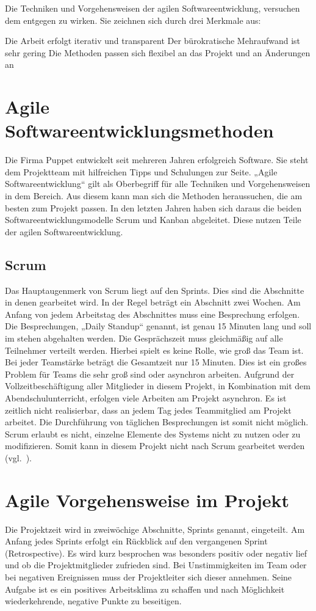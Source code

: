 Die Techniken und Vorgehensweisen der agilen Softwareentwicklung, versuchen dem
entgegen zu wirken. Sie zeichnen sich durch drei Merkmale aus:

\begin{outline}
  \1 Die Arbeit erfolgt iterativ und transparent
  \1 Der bürokratische Mehraufwand ist sehr gering
  \1 Die Methoden passen sich flexibel an das Projekt und an Änderungen an
\end{outline}

\section{Agile Softwareentwicklungsmethoden}
Die Firma Puppet entwickelt seit mehreren Jahren erfolgreich Software. Sie
steht dem Projektteam mit hilfreichen Tipps und Schulungen zur Seite. „Agile
Softwareentwicklung“ gilt als Oberbegriff für alle Techniken und
Vorgehensweisen in dem Bereich. Aus diesem kann man sich die Methoden
heraussuchen, die am besten zum Projekt passen. In den letzten Jahren haben
sich daraus die beiden Softwareentwicklungsmodelle Scrum und Kanban abgeleitet.
Diese nutzen Teile der agilen Softwareentwicklung.
\tm%

\subsection{Scrum}
Das Hauptaugenmerk von Scrum liegt auf den Sprints. Dies sind die Abschnitte in
denen gearbeitet wird. In der Regel beträgt ein Abschnitt zwei Wochen. Am
Anfang von jedem Arbeitstag des Abschnittes muss eine Besprechung erfolgen. Die
Besprechungen, „Daily Standup“ genannt, ist genau 15 Minuten lang und soll im
stehen abgehalten werden. Die Gesprächszeit muss gleichmäßig auf alle
Teilnehmer verteilt werden. Hierbei spielt es keine Rolle, wie groß das Team
ist. Bei jeder Teamstärke beträgt die Gesamtzeit nur 15 Minuten. Dies ist ein
großes Problem für Teams die sehr groß sind oder asynchron arbeiten. Aufgrund
der Vollzeitbeschäftigung aller Mitglieder in diesem Projekt, in Kombination
mit dem Abendschulunterricht, erfolgen viele Arbeiten am Projekt asynchron. Es
ist zeitlich nicht realisierbar, dass an jedem Tag jedes Teammitglied am
Projekt arbeitet. Die Durchführung von täglichen Besprechungen ist somit nicht
möglich. Scrum erlaubt es nicht, einzelne Elemente des Systems nicht zu nutzen
oder zu modifizieren. Somit kann in diesem Projekt nicht nach Scrum gearbeitet
werden (vgl.~\cite{scrum_talk}).
\tm%

\section{Agile Vorgehensweise im Projekt}
\label{sec:agile_vorgehensweise}
Die Projektzeit wird in zweiwöchige Abschnitte, Sprints genannt, eingeteilt. Am
Anfang jedes Sprints erfolgt ein Rückblick auf den vergangenen Sprint
(Retrospective). Es wird kurz besprochen was besonders positiv oder negativ
lief und ob die Projektmitglieder zufrieden sind. Bei Unstimmigkeiten im Team
oder bei negativen Ereignissen muss der Projektleiter sich dieser annehmen.
Seine Aufgabe ist es ein positives Arbeitsklima zu schaffen und nach
Möglichkeit wiederkehrende, negative Punkte zu beseitigen.

